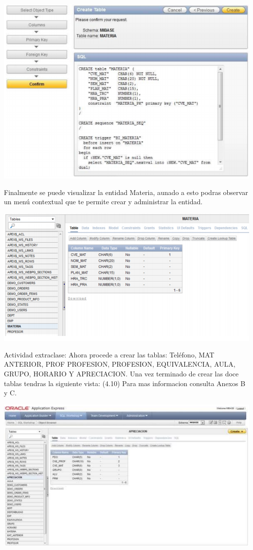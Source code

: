 \documentclass[12pt,letterpaper]{article}
\begin{document}
\begin{center}
\includegraphics[width=15cm]{./IMG/img20}
\end{center}
Finalmente se puede visualizar la entidad Materia, aunado a esto podras observar
un menú contextual que te permite crear y administrar la entidad. 
\begin{center}
\includegraphics[width=15cm]{./IMG/img21}
\end{center}

Actividad extraclase: Ahora procede a crear las tablas: Teléfono,
MAT ANTERIOR, PROF PROFESION, PROFESION, EQUIVALENCIA, AULA,
GRUPO, HORARIO Y APRECIACION. Una vez terminado de crear las doce
tablas tendras la siguiente vista: (4.10) Para mas informacion consulta Anexos B y
C.

\begin{center}
\includegraphics[width=15cm]{./IMG/img22}
\end{center}
\end{document}
